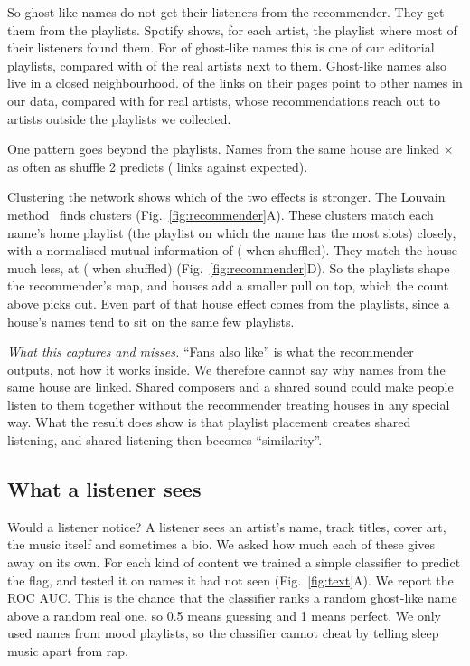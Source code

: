 \documentclass[9pt,twocolumn,twoside]{pnas-new}
\begin{document}
So ghost-like names do not get their listeners from the recommender. They get them from the playlists. Spotify shows, for each artist, the playlist where most of their listeners found them. For \discOursG{} of ghost-like names this is one of our editorial playlists, compared with \discOursR{} of the real artists next to them. Ghost-like names also live in a closed neighbourhood. \inSetGhost{} of the links on their pages point to other names in our data, compared with \inSetReal{} for real artists, whose recommendations reach out to artists outside the playlists we collected.

One pattern goes beyond the playlists. Names from the same house are linked \samePl$\times$ as often as shuffle 2 predicts (\sameObs{} links against \sameExpPl{} expected).

Clustering the network shows which of the two effects is stronger. The Louvain method~\cite{blondel2008louvain} finds \nComm{} clusters (Fig.~\ref{fig:recommender}A). These clusters match each name's home playlist (the playlist on which the name has the most slots) closely, with a normalised mutual information of \nmiHome{} (\nmiHomeNull{} when shuffled). They match the house much less, at \nmiHouse{} (\nmiHouseNull{} when shuffled) (Fig.~\ref{fig:recommender}D). So the playlists shape the recommender's map, and houses add a smaller pull on top, which the count above picks out. Even part of that house effect comes from the playlists, since a house's names tend to sit on the same few playlists.

\emph{What this captures and misses.} ``Fans also like'' is what the recommender outputs, not how it works inside. We therefore cannot say why names from the same house are linked. Shared composers and a shared sound could make people listen to them together without the recommender treating houses in any special way. What the result does show is that playlist placement creates shared listening, and shared listening then becomes ``similarity''.



\subsection*{What a listener sees}
Would a listener notice? A listener sees an artist's name, track titles, cover art, the music itself and sometimes a bio. We asked how much each of these gives away on its own. For each kind of content we trained a simple classifier to predict the flag, and tested it on names it had not seen (Fig.~\ref{fig:text}A). We report the ROC AUC. This is the chance that the classifier ranks a random ghost-like name above a random real one, so 0.5 means guessing and 1 means perfect. We only used names from mood playlists, so the classifier cannot cheat by telling sleep music apart from rap.
\end{document}
